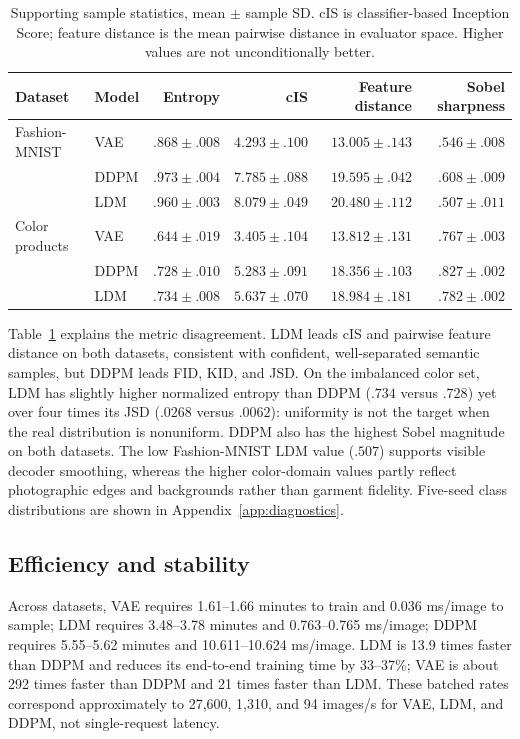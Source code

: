 \documentclass{article}
\begin{document}
\begin{table}[ht]
\caption{Supporting sample statistics, mean $\pm$ sample SD. cIS is classifier-based Inception Score; feature distance is the mean pairwise distance in evaluator space. Higher values are not unconditionally better.}
\label{tab:supporting}
\centering
\scriptsize
\begin{tabular}{llrrrr}
\toprule
Dataset & Model & Entropy & cIS & Feature distance & Sobel sharpness \\
\midrule
Fashion-MNIST & VAE  & $.868\pm.008$ & $4.293\pm.100$ & $13.005\pm.143$ & $.546\pm.008$ \\
 & DDPM & $.973\pm.004$ & $7.785\pm.088$ & $19.595\pm.042$ & $.608\pm.009$ \\
 & LDM  & $.960\pm.003$ & $8.079\pm.049$ & $20.480\pm.112$ & $.507\pm.011$ \\
\midrule
Color products & VAE  & $.644\pm.019$ & $3.405\pm.104$ & $13.812\pm.131$ & $.767\pm.003$ \\
 & DDPM & $.728\pm.010$ & $5.283\pm.091$ & $18.356\pm.103$ & $.827\pm.002$ \\
 & LDM  & $.734\pm.008$ & $5.637\pm.070$ & $18.984\pm.181$ & $.782\pm.002$ \\
\bottomrule
\end{tabular}
\end{table}

Table~\ref{tab:supporting} explains the metric disagreement. LDM leads cIS and pairwise feature distance on both datasets, consistent with confident, well-separated semantic samples, but DDPM leads FID, KID, and JSD. On the imbalanced color set, LDM has slightly higher normalized entropy than DDPM ($.734$ versus $.728$) yet over four times its JSD ($.0268$ versus $.0062$): uniformity is not the target when the real distribution is nonuniform. DDPM also has the highest Sobel magnitude on both datasets. The low Fashion-MNIST LDM value ($.507$) supports visible decoder smoothing, whereas the higher color-domain values partly reflect photographic edges and backgrounds rather than garment fidelity. Five-seed class distributions are shown in Appendix~\ref{app:diagnostics}.

\subsection{Efficiency and stability}

Across datasets, VAE requires 1.61--1.66 minutes to train and 0.036 ms/image to sample; LDM requires 3.48--3.78 minutes and 0.763--0.765 ms/image; DDPM requires 5.55--5.62 minutes and 10.611--10.624 ms/image. LDM is 13.9 times faster than DDPM and reduces its end-to-end training time by 33--37\%; VAE is about 292 times faster than DDPM and 21 times faster than LDM. These batched rates correspond approximately to 27,600, 1,310, and 94 images/s for VAE, LDM, and DDPM, not single-request latency.
\end{document}
